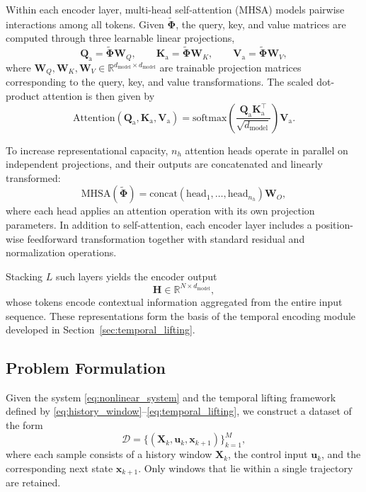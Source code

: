 \documentclass[journal]{IEEEtran}
\newcommand{\vx}{\mathbf{x}}
\newcommand{\vu}{\mathbf{u}}
\newcommand{\mW}{\mathbf{W}}
\newcommand{\mX}{\mathbf{X}}
\newcommand{\mH}{\mathbf{H}}
\newcommand{\mPhi}{\boldsymbol{\Phi}}
\newcommand{\mQa}{\mathbf{Q}_{\mathrm{a}}}
\newcommand{\mKa}{\mathbf{K}_{\mathrm{a}}}
\newcommand{\mVa}{\mathbf{V}_{\mathrm{a}}}
\begin{document}
Within each encoder layer, multi-head self-attention (MHSA) models pairwise interactions among all tokens. Given $\widetilde{\mPhi}$, the query, key, and value matrices are computed through three learnable linear projections,
\begin{equation}
    \mQa = \widetilde{\mPhi}\mW_Q, \qquad
    \mKa = \widetilde{\mPhi}\mW_K, \qquad
    \mVa = \widetilde{\mPhi}\mW_V,
    \label{eq:qkv}
\end{equation}
where $\mW_Q, \mW_K, \mW_V \in \mathbb{R}^{d_{\mathrm{model}} \times d_{\mathrm{model}}}$ are trainable projection matrices corresponding to the query, key, and value transformations. The scaled dot-product attention is then given by
\begin{equation}
    \mathrm{Attention}(\mQa,\mKa,\mVa)
    =
    \mathrm{softmax}\!\left(\frac{\mQa\mKa^\top}{\sqrt{d_{\mathrm{model}}}}\right)\mVa.
    \label{eq:attention}
\end{equation}

To increase representational capacity, $n_h$ attention heads operate in parallel on independent projections, and their outputs are concatenated and linearly transformed:
\begin{equation}
    \mathrm{MHSA}(\widetilde{\mPhi})
    =
    \mathrm{concat}(\mathrm{head}_1,\ldots,\mathrm{head}_{n_h})\mW_O,
    \label{eq:mhsa}
\end{equation}
where each head applies an attention operation with its own projection parameters. In addition to self-attention, each encoder layer includes a position-wise feedforward transformation together with standard residual and normalization operations.

Stacking $L$ such layers yields the encoder output
\begin{equation}
    \mH \in \mathbb{R}^{N \times d_{\mathrm{model}}},
\end{equation}
whose tokens encode contextual information aggregated from the entire input sequence. These representations form the basis of the temporal encoding module developed in Section~\ref{sec:temporal_lifting}.

\subsection{Problem Formulation}
\label{sec:problem}

Given the system \eqref{eq:nonlinear_system} and the temporal lifting framework defined by \eqref{eq:history_window}--\eqref{eq:temporal_lifting}, we construct a dataset of the form
\begin{equation}
    \mathcal{D} = \{(\mX_k, \vu_k, \vx_{k+1})\}_{k=1}^{M},
    \label{eq:dataset}
\end{equation}
where each sample consists of a history window $\mX_k$, the control input $\vu_k$, and the corresponding next state $\vx_{k+1}$. Only windows that lie within a single trajectory are retained.
\end{document}
